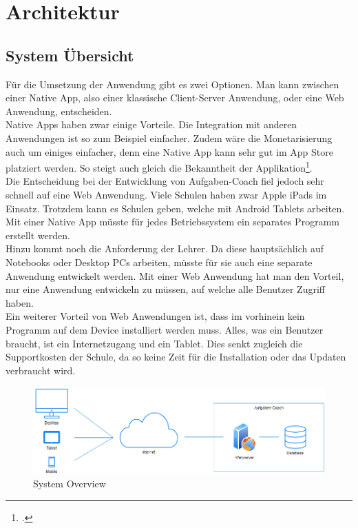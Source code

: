 \section{Architektur}
\subsection{System Übersicht}
Für die Umsetzung der Anwendung gibt es zwei Optionen. Man kann zwischen einer Native App, also einer klassische Client-Server Anwendung, oder eine Web Anwendung, entscheiden. \\

Native Apps haben zwar einige Vorteile. Die Integration mit anderen Anwendungen ist so zum Beispiel einfacher. Zudem wäre die Monetarisierung auch um einiges einfacher, denn eine Native App kann sehr gut im App Store platziert werden. So steigt auch gleich die Bekanntheit der Applikation\footcite{native_app}. \\

Die Entscheidung bei der Entwicklung von Aufgaben-Coach fiel jedoch sehr schnell auf eine Web Anwendung. Viele Schulen haben zwar Apple iPads im Einsatz. Trotzdem kann es Schulen geben, welche mit Android Tablets arbeiten. Mit einer Native App müsste für jedes Betriebssystem ein separates Programm erstellt werden.\\

Hinzu kommt noch die Anforderung der Lehrer. Da diese hauptsächlich auf Notebooks oder Desktop PCs arbeiten, müsste für sie auch eine separate Anwendung entwickelt werden. Mit einer Web Anwendung hat man den Vorteil, nur eine Anwendung entwickeln zu müssen, auf welche alle Benutzer Zugriff haben.\\

Ein weiterer Vorteil von Web Anwendungen ist, dass im vorhinein kein Programm auf dem Device installiert werden muss. Alles, was ein Benutzer braucht, ist ein Internetzugang und ein Tablet. Dies senkt zugleich die Supportkosten der Schule, da so keine Zeit für die Installation oder das Updaten verbraucht wird.

\begin{figure}[H]
\begin{center}
	\includegraphics[width=\textwidth, keepaspectratio]{images/system_overview.png}
	\caption{System Overview}
	\label{fig:system_overview}
\end{center}
\end{figure}


